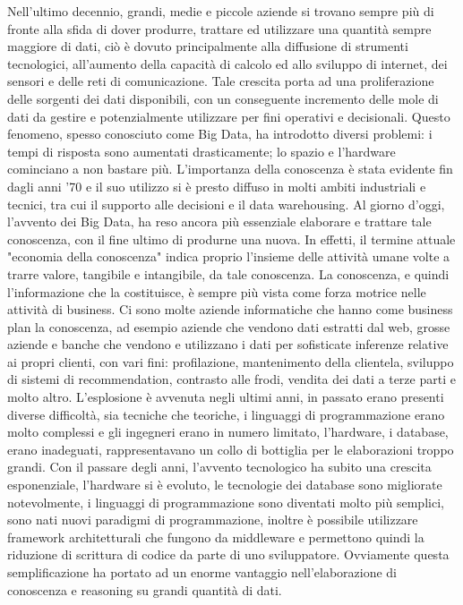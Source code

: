 Nell'ultimo decennio, grandi, medie e piccole aziende si trovano sempre più di fronte alla sfida di dover produrre, trattare ed utilizzare una quantità sempre maggiore di dati, ciò è dovuto principalmente alla diffusione di strumenti tecnologici, all'aumento della capacità di calcolo ed allo sviluppo di internet, dei sensori e delle reti di comunicazione. \newline
Tale crescita porta ad una proliferazione delle sorgenti dei dati disponibili, con un conseguente incremento delle mole di dati da gestire e potenzialmente utilizzare per fini operativi e decisionali. Questo fenomeno, spesso conosciuto come Big Data, ha introdotto diversi problemi: i tempi di risposta sono aumentati drasticamente; lo spazio e l'hardware cominciano a non bastare più. \newline
L'importanza della conoscenza è stata evidente fin dagli anni '70 e il suo utilizzo si è presto diffuso in molti ambiti industriali e tecnici, tra cui il supporto alle decisioni e il data warehousing. \newline
Al giorno d'oggi, l'avvento dei Big Data, ha reso ancora più essenziale elaborare e trattare tale conoscenza, con il fine ultimo di produrne una nuova. \newline
In effetti, il termine attuale "economia della conoscenza" indica proprio l'insieme delle attività umane volte a trarre valore, tangibile e intangibile, da tale conoscenza. La conoscenza, e quindi l'informazione che la costituisce, è sempre più vista come forza motrice nelle attività di business. Ci sono molte aziende informatiche che hanno come business plan la conoscenza, ad esempio aziende che vendono dati estratti dal web, grosse aziende e banche che vendono e utilizzano i dati per sofisticate inferenze relative ai propri clienti, con vari fini: profilazione, mantenimento della clientela, sviluppo di sistemi di recommendation, contrasto alle frodi, vendita dei dati a terze parti e molto altro. \newline
L'esplosione è avvenuta negli ultimi anni, in passato erano presenti diverse difficoltà, sia tecniche che teoriche, i linguaggi di programmazione erano molto complessi e gli ingegneri erano in numero limitato, l'hardware, i database, erano inadeguati, rappresentavano un collo di bottiglia per le elaborazioni troppo grandi. \newline
Con il passare degli anni, l'avvento tecnologico ha subito una crescita esponenziale, l'hardware si è evoluto, le tecnologie dei database sono migliorate notevolmente, i linguaggi di programmazione sono diventati molto più semplici, sono nati nuovi paradigmi di programmazione, inoltre è possibile utilizzare framework architetturali che fungono da middleware e permettono quindi la riduzione di scrittura di codice da parte di uno sviluppatore. Ovviamente questa semplificazione ha portato ad un enorme vantaggio nell'elaborazione di conoscenza e reasoning su grandi quantità di dati. \newline
